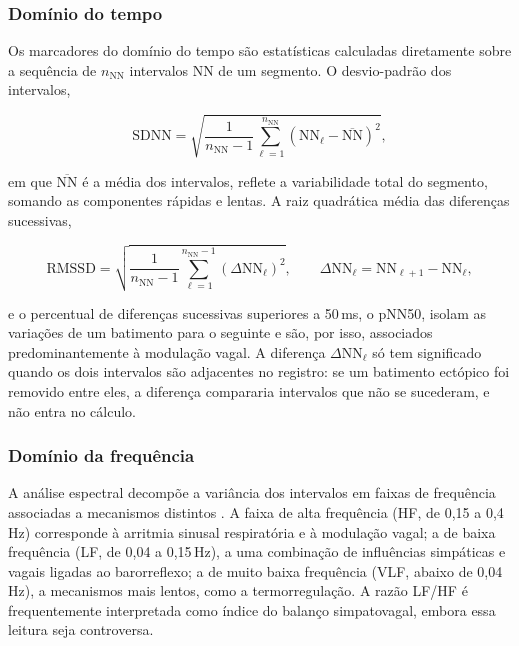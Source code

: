 \subsubsection{Domínio do tempo}

Os marcadores do domínio do tempo são estatísticas calculadas diretamente
sobre a sequência de $n_{\mathrm{NN}}$ intervalos NN de um segmento. O
desvio-padrão dos intervalos,

\begin{equation}
	\mathrm{SDNN} = \sqrt{\frac{1}{n_{\mathrm{NN}} - 1}
		\sum_{\ell=1}^{n_{\mathrm{NN}}}
		\left( \mathrm{NN}_\ell - \overline{\mathrm{NN}} \right)^2},
	\label{eq:sdnn}
\end{equation}

\noindent
em que $\overline{\mathrm{NN}}$ é a média dos intervalos, reflete a
variabilidade total do segmento, somando as componentes rápidas e lentas.
A raiz quadrática média das diferenças sucessivas,

\begin{equation}
	\mathrm{RMSSD} = \sqrt{\frac{1}{n_{\mathrm{NN}} - 1}
		\sum_{\ell=1}^{n_{\mathrm{NN}} - 1} \left( \Delta \mathrm{NN}_\ell \right)^2},
	\qquad
	\Delta \mathrm{NN}_\ell = \mathrm{NN}_{\ell+1} - \mathrm{NN}_\ell,
	\label{eq:rmssd}
\end{equation}

\noindent
e o percentual de diferenças sucessivas superiores a 50\,ms, o pNN50,
isolam as variações de um batimento para o seguinte e são, por isso,
associados predominantemente à modulação vagal. A diferença
$\Delta \mathrm{NN}_\ell$ só tem significado quando os dois intervalos são
adjacentes no registro: se um batimento ectópico foi removido entre eles, a
diferença compararia intervalos que não se sucederam, e não entra no
cálculo.

\subsubsection{Domínio da frequência}

A análise espectral decompõe a variância dos intervalos em faixas de
frequência associadas a mecanismos distintos \cite{taskforce1996heart}. A
faixa de alta frequência (HF, de 0,15 a 0,4\,Hz) corresponde à arritmia
sinusal respiratória e à modulação vagal; a de baixa frequência (LF, de
0,04 a 0,15\,Hz), a uma combinação de influências simpáticas e vagais
ligadas ao barorreflexo; a de muito baixa frequência (VLF, abaixo de
0,04\,Hz), a mecanismos mais lentos, como a termorregulação. A razão LF/HF
é frequentemente interpretada como índice do balanço simpatovagal, embora
essa leitura seja controversa.

